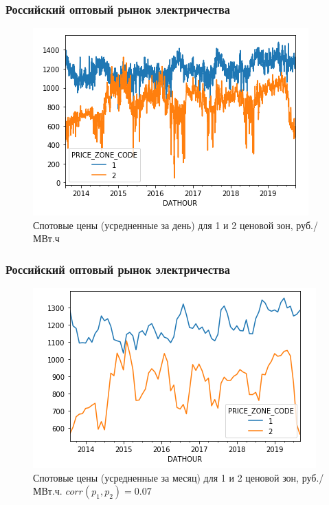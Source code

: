 \documentclass[c, dvipsnames]{beamer}  %
\begin{document}
\begin{frame}[shrink=5]
\frametitle{Российский оптовый рынок электричества} 

\begin{figure}
	\centering
	\includegraphics[width=0.7\linewidth]{screenshot009}
	\caption{Спотовые цены (усредненные за день) для 1 и 2 ценовой зон, руб./МВт.ч}
	\label{fig:screenshot009}
\end{figure}


\end{frame}


\begin{frame}[shrink=5]
\frametitle{Российский оптовый рынок электричества} 

\begin{figure}
	\centering
	\includegraphics[width=0.7\linewidth]{screenshot010}
	\caption{Спотовые цены (усредненные за месяц) для 1 и 2 ценовой зон, руб./МВт.ч. $corr(p_1,p_2)  =  0.07  $}
	\label{fig:screenshot009}
\end{figure}




\end{frame}
\end{document}
